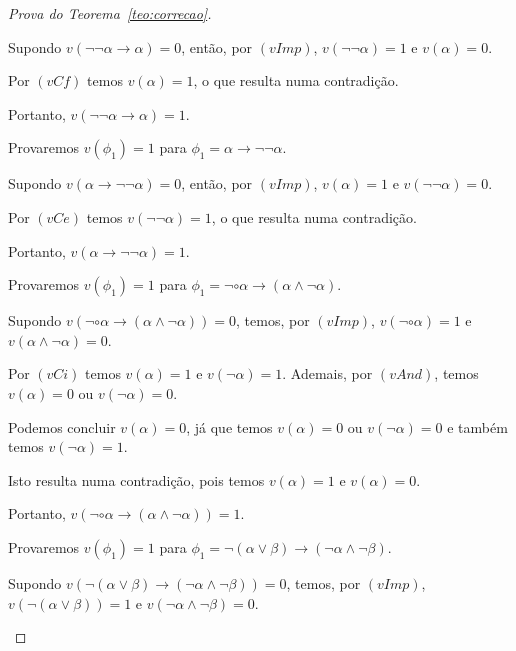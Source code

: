 \begin{proof}[Prova do Teorema~\ref{teo:correcao}]
\begin{provaporcasos}
\begin{provaporsubcasos}
                    Supondo $v(\neg \neg \alpha \to \alpha) = 0$, então, por $(vImp)$, $v(\neg \neg \alpha) = 1$ e $v(\alpha) = 0$. 
                    
                    Por $(vCf)$ temos $v(\alpha) = 1$, o que resulta numa contradição. 
                    
                    Portanto, $v(\neg \neg \alpha \to \alpha) = 1$.

                \subcasodeprova Provaremos $v(\phi_{1}) = 1$ para $\phi_{1} = \alpha \to \neg \neg \alpha$. 
                
                    Supondo $v(\alpha \to \neg \neg \alpha) = 0$, então, por $(vImp)$, $v(\alpha) = 1$ e $v(\neg \neg \alpha) = 0$. 
                    
                    Por $(vCe)$ temos $v(\neg \neg \alpha) = 1$, o que resulta numa contradição. 
                    
                    Portanto, $v(\alpha \to \neg \neg \alpha) = 1$.

                \subcasodeprova Provaremos $v(\phi_{1}) = 1$ para $\phi_{1} = \neg \circ \alpha \to (\alpha \land \neg \alpha)$. 
                
                    Supondo $v(\neg \circ \alpha \to (\alpha \land \neg \alpha)) = 0$, temos, por $(vImp)$, $v(\neg \circ \alpha) = 1$ e $v(\alpha \land \neg \alpha) = 0$. 
                    
                    Por $(vCi)$ temos $v(\alpha) = 1$ e $v(\neg \alpha) = 1$. Ademais, por $(vAnd)$, temos $v(\alpha) = 0$ ou $v(\neg \alpha) = 0$. 
                    
                    Podemos concluir $v(\alpha) = 0$, já que temos $v(\alpha) = 0$ ou $v(\neg \alpha) = 0$ e também temos $v(\neg \alpha) = 1$. 
                    
                    Isto resulta numa contradição, pois temos $v(\alpha) = 1$ e  $v(\alpha) = 0$. 
                    
                    Portanto, $v(\neg \circ \alpha \to (\alpha \land \neg \alpha)) = 1$.

                \subcasodeprova Provaremos $v(\phi_{1}) = 1$ para $\phi_{1} = \neg (\alpha \lor \beta) \to (\neg \alpha \land \neg \beta)$. 
                
                    Supondo $v(\neg (\alpha \lor \beta) \to (\neg \alpha \land \neg \beta)) = 0$, temos, por $(vImp)$, $v(\neg (\alpha \lor \beta)) = 1$ e $v(\neg \alpha \land \neg \beta) = 0$. 
                    

\end{provaporsubcasos}
\end{provaporcasos}
\end{proof}
